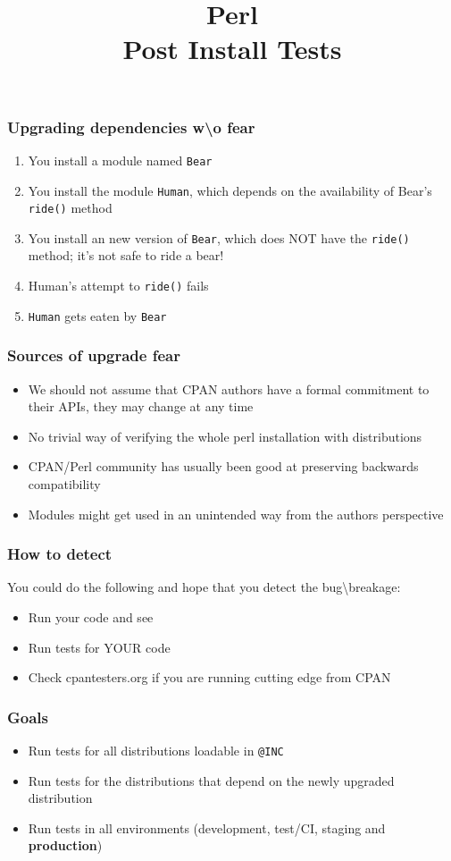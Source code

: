 \documentclass[10pt]{beamer}
\title{Perl \\ Post Install Tests}
\begin{document}
\begin{frame}
\titlepage
\end{frame}


\begin{frame}[fragile]
\frametitle{Upgrading dependencies w\textbackslash o fear}
\begin{enumerate}
  \item You install a module named \verb|Bear|
  \item You install the module \verb|Human|, which depends on the availability of Bear's \verb|ride()| method
  \item You install an new version of \verb|Bear|, which does NOT have the \verb|ride()| method; it's not safe to ride a bear!
  \item Human's attempt to \verb|ride()| fails
  \item \verb|Human| gets eaten by \verb|Bear|
\end{enumerate}
\end{frame}

\begin{frame}
\frametitle{Sources of upgrade fear}
\begin{itemize}
\item We should not assume that CPAN authors have a formal commitment to their APIs, they may change at any time
\item No trivial way of verifying the whole perl installation with distributions
\item CPAN/Perl community has usually been good at preserving backwards compatibility
\item Modules might get used in an unintended way from the authors perspective
\end{itemize}
\end{frame}

\begin{frame}[fragile]
\frametitle{How to detect}
You could do the following and hope that you detect the bug\textbackslash breakage:
\begin{itemize}
\item Run your code and see
\item Run tests for YOUR code
\item Check cpantesters.org if you are running cutting edge from CPAN
\end{itemize}
\end{frame}
\begin{frame}[fragile]
\frametitle{Goals}
\begin{itemize}
\item Run tests for all distributions loadable in \verb|@INC|
\item Run tests for the distributions that depend on the newly upgraded distribution
\item Run tests in all environments (development, test/CI, staging and {\bf production})
\end{itemize}
\end{frame}
\end{document}
